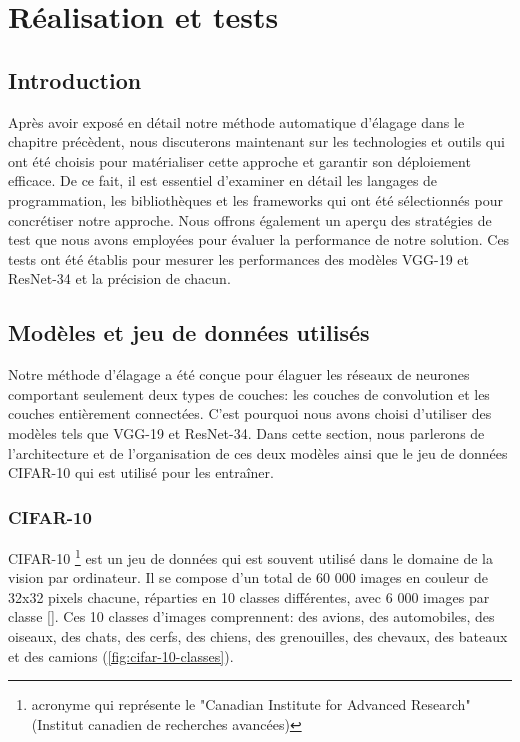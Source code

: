 

\chapter{Réalisation et tests}
\section{Introduction}
Après avoir exposé en détail notre méthode automatique d'élagage dans le chapitre précèdent, nous discuterons maintenant sur les technologies et outils qui ont été choisis pour matérialiser cette approche et garantir son déploiement efficace. De ce fait, il est essentiel d'examiner en détail les langages de programmation, les bibliothèques et les frameworks qui ont été sélectionnés pour concrétiser notre approche. Nous offrons également un aperçu des stratégies de test que nous avons employées pour évaluer la performance de notre solution. Ces tests ont été établis pour mesurer les performances des modèles VGG-19 et ResNet-34 et la précision de chacun.

\section{Modèles et jeu de données utilisés}
Notre méthode d'élagage a été conçue pour élaguer les réseaux de neurones comportant seulement deux types de couches: les couches de convolution et les couches entièrement connectées. C'est pourquoi nous avons choisi d'utiliser des modèles tels que VGG-19 et ResNet-34. Dans cette section, nous parlerons de l'architecture et de l'organisation de ces deux modèles ainsi que le jeu de données CIFAR-10 qui est utilisé pour les entraîner.
\subsection{CIFAR-10}
CIFAR-10 \footnote{acronyme qui représente le "Canadian Institute for Advanced Research" (Institut canadien de recherches avancées)} est un jeu de données qui est souvent utilisé dans le domaine de la vision par ordinateur. Il se compose d'un total de 60 000 images en couleur de 32x32 pixels chacune, réparties en 10 classes différentes, avec 6 000 images par classe [\cite{krizhevsky2009learning}]. Ces 10 classes d'images comprennent: des avions, des automobiles, des oiseaux, des chats, des cerfs, des chiens, des grenouilles, des chevaux, des bateaux et des camions (\ref{fig:cifar-10-classes}).

